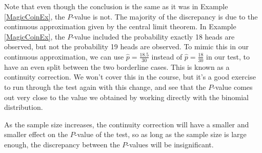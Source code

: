 Note that even though the conclusion is the same as it was in Example \ref{MagicCoinEx}, the $P$-value is not. The majority of the discrepancy is due to the continuous approximation given by the central limit theorem. In Example \ref{MagicCoinEx}, the $P$-value included the probability exactly 18 heads are observed, but not the probability 19 heads are observed. To mimic this in our continuous approximation, we can use $\widehat{p} = \frac{18.5}{30}$ instead of $\widehat{p} = \frac{18}{30}$ in our test, to have an even split between the two borderline cases. This is known as a continuity correction. We won't cover this in the course, but it's a good exercise to run through the test again with this change, and see that the $P$-value comes out very close to the value we obtained by working directly with the binomial distribution. 

As the sample size increases, the continuity correction will have a smaller and smaller effect on the $P$-value of the test, so as long as the sample size is large enough, the discrepancy between the $P$-values will be insignificant.

